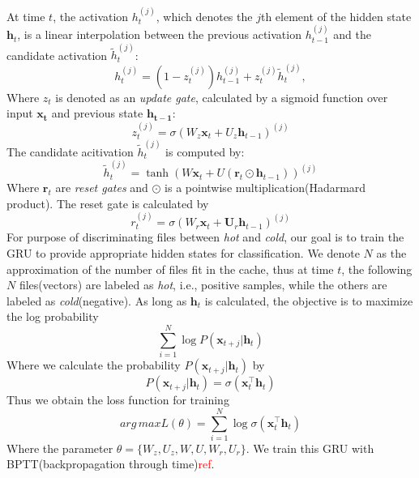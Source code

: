 \documentclass[conference]{IEEEtran}
\begin{document}
At time $t$, the activation $h_t^{(j)}$, which denotes the $j$th element of the hidden state $\mathbf{h}_t$, is a linear interpolation between the previous activation $h_{t-1}^{(j)}$ and the candidate activation $\tilde{h}_t^{(j)}$:
\begin{equation}
    h_t^{(j)} = (1-z_t^{(j)}) h_{t-1}^{(j)} + z_t^{(j)}\tilde{h}_t^{(j)},
\end{equation}
Where $z_t$ is denoted as an \textit{update gate}, calculated by a sigmoid function over input $\mathbf{x_t}$ and previous state $\mathbf{h_{t-1}}$:
\begin{equation}
z_t^{(j)} = \sigma(W_z \mathbf{x}_t + U_z \mathbf{h}_{t-1})^{(j)}
\end{equation}
The candidate acitivation $\tilde{h}_t^{(j)}$ is computed by:
\begin{equation}
    \tilde{h}_t^{(j)} = \tanh(W \mathbf{x}_t + U (\mathbf{r}_t \odot \mathbf{h}_{t-1}))^{(j)}
\end{equation}
Where $\mathbf{r}_t$ are \textit{reset gates} and $\odot$ is a pointwise multiplication(Hadarmard product).
The reset gate is calculated by
\begin{equation}
    r_t^{(j)} = \sigma(W_r \mathbf{x}_t + \mathbf{U}_r \mathbf{h}_{t-1})^{(j)}
\end{equation}
For purpose of discriminating files between \textit{hot} and \textit{cold}, 
our goal is to train the GRU to provide appropriate hidden states for classification. 
We denote $N$ as the approximation of the number of files fit in the cache,
thus at time $t$, the following $N$ files(vectors) are labeled as \textit{hot}, i.e., positive samples, 
while the others are labeled as \textit{cold}(negative).
As long as $\mathbf{h}_t$ is calculated, the objective is to maximize the log probability
\begin{equation}
    \label{eq.obj}
    \sum_{i=1}^N \log P(\mathbf{x}_{t+j}|\mathbf{h}_t)
\end{equation}
Where we calculate the probability $P(\mathbf{x}_{t+j}|\mathbf{h}_t)$ by
\begin{equation}
    P(\mathbf{x}_{t+j}|\mathbf{h}_t) = \sigma(\mathbf{x}^\top_t \mathbf{h}_t)
\end{equation}
Thus we obtain the loss function for training
\begin{equation}
    arg\,max L(\theta) = \sum_{i=1}^N \log \sigma(\mathbf{x}^\top_t \mathbf{h}_t)
\end{equation}
Where the parameter $\theta = \{W_z, U_z, W, U, W_r, U_r\}$.
We train this GRU with BPTT(backpropagation through time)\textcolor{red}{ref}.
\end{document}
